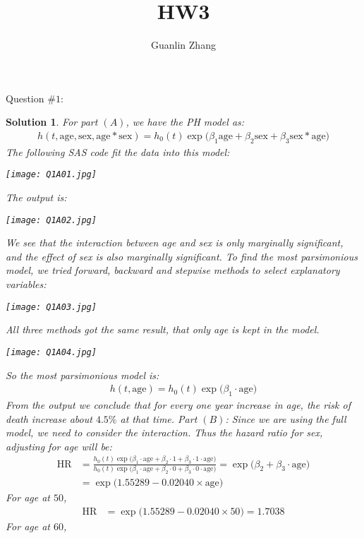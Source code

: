 \documentclass[11pt]{article}
\title{HW3}
\author{Guanlin Zhang}
\newtheorem{sol}{Solution}
\begin{document}
Question $\# 1$:
\begin{sol}
	For part $(A)$, \vskip 2mm
	we have the PH model as:
	\begin{align*}
		h(t, \text{age}, \text{sex}, \text{age}*\text{sex}) = h_0(t)\exp\Big(\beta_1 \text{age} + \beta_2\text{sex} + \beta_3\text{sex}*\text{age}\Big)
	\end{align*}	
	The following SAS code fit the data into this model:
	\begin{center}
		\texttt{[image: Q1A01.jpg]}
	\end{center}
	The output is:
	\begin{center}
		\texttt{[image: Q1A02.jpg]}
	\end{center}
	We see that the interaction between age and sex is only marginally significant, and the effect of sex is also marginally significant.\vskip 2mm
	To find the most parsimonious model, we tried forward, backward and stepwise methods to select explanatory variables:
	\begin{center}
		\texttt{[image: Q1A03.jpg]}
	\end{center}
	All three methods got the same result, that only age is kept in the model.
	\begin{center}
		\texttt{[image: Q1A04.jpg]}
	\end{center}
	So the most parsimonious model is:
	\begin{align*}
		h(t, \text{age}) = h_0(t)\exp\Big(\beta_1 \cdot  \text{age}\Big)
	\end{align*}
	From the output we conclude that for every one year increase in age, the risk of death increase about $4.5\%$ at that time.\vskip 2mm
	Part $(B)$:\vskip 2mm
	Since we are using the full model, we need to consider the interaction. Thus the hazard ratio for sex, adjusting for age will be:
	\begin{align*}
		\text{HR} &= \frac{h_0(t)\exp\Big(\beta_1\cdot \text{age} + \beta_2\cdot 1 + \beta_3\cdot 1\cdot \text{age}\Big)}{h_0(t)\exp\Big(\beta_1\cdot\text{age} + \beta_2\cdot 0 + \beta_3\cdot 0\cdot \text{age}\Big)} = \exp\Big(\beta_2 + \beta_3\cdot \text{age}\Big)\\
		&= \exp\Big(1.55289 -0.02040\times \text{age}\Big)
	\end{align*}
	For age at $50$, 
	\begin{align*}
		\text{HR} &= \exp\Big(1.55289 -0.02040\times 50\Big) = 1.7038
	\end{align*}
	For age at $60$, 
	\begin{align*}

\end{align*}
\end{sol}
\end{document}
